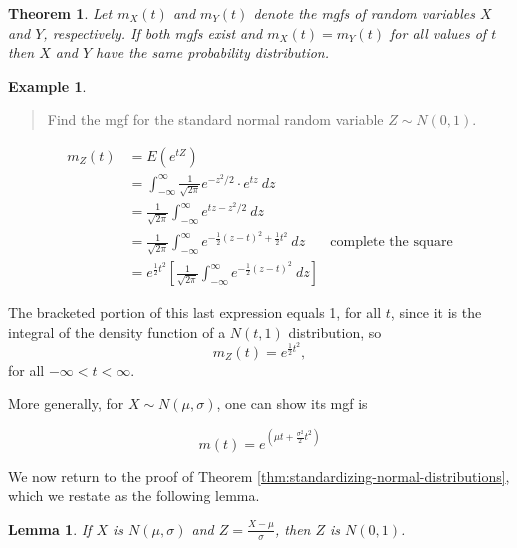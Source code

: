 \documentclass[
]{book}
\newtheorem{theorem}{Theorem}[chapter]
\newtheorem{lemma}{Lemma}[chapter]
\theoremstyle{definition}
\theoremstyle{definition}
\newtheorem{example}{Example}[chapter]
\theoremstyle{definition}
\theoremstyle{definition}
\theoremstyle{remark}
\begin{document}
\begin{theorem}
\protect\hypertarget{thm:unique-mgf}{}\label{thm:unique-mgf}Let \(m_X(t)\) and \(m_Y(t)\) denote the mgfs of random variables \(X\) and \(Y\), respectively. If both mgfs exist and \(m_X(t) = m_Y(t)\) for all values of \(t\) then \(X\) and \(Y\) have the same probability distribution.
\end{theorem}

\begin{example}
\leavevmode

\begin{quote}
Find the mgf for the standard normal random variable \(Z \sim N(0,1)\).
\end{quote}

\begin{align*}
m_Z(t) &= E(e^{tZ})\\
      &= \int_{-\infty}^\infty \frac{1}{\sqrt{2\pi}}e^{-z^2/2}\cdot e^{tz}~dz\\
      &= \frac{1}{\sqrt{2\pi}} \int_{-\infty}^\infty e^{tz-z^2/2}~dz\\
      &= \frac{1}{\sqrt{2\pi}} \int_{-\infty}^\infty e^{-\frac{1}{2}(z-t)^2+\frac{1}{2}t^2}~dz &\text{complete the square}\\
      &= e^{\frac{1}{2}t^2}\left[\frac{1}{\sqrt{2\pi}} \int_{-\infty}^\infty e^{-\frac{1}{2}(z-t)^2}~dz\right]
\end{align*}

The bracketed portion of this last expression equals 1, for all \(t\), since it is the integral of the density function of a \(N(t,1)\) distribution, so \[m_Z(t) = e^{\frac{1}{2}t^2},\] for all \(-\infty < t < \infty\).

More generally, for \(X \sim N(\mu,\sigma)\), one can show its mgf is

\begin{equation} 
  m(t) = e^{\left(\mu t + \frac{\sigma^2}{2}t^2\right)} 
  \label{eq:normal-mgf}
\end{equation}

\end{example}

We now return to the proof of Theorem \ref{thm:standardizing-normal-distributions}, which we restate as the following lemma.

\begin{lemma}
\protect\hypertarget{lem:Z-is-standard-normal}{}\label{lem:Z-is-standard-normal}If \(X\) is \(N(\mu,\sigma)\) and \(Z = \frac{X-\mu}{\sigma}\), then \(Z\) is \(N(0,1)\).
\end{lemma}
\end{document}
